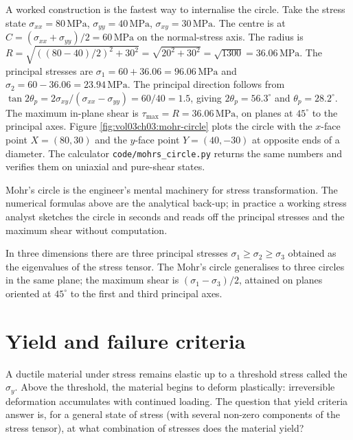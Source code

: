 

A worked construction is the fastest way to internalise the circle.
Take the stress state $\sigma_{xx} = 80\,\text{MPa}$, $\sigma_{yy} =
40\,\text{MPa}$, $\sigma_{xy} = 30\,\text{MPa}$. The centre is at
$C = (\sigma_{xx} + \sigma_{yy})/2 = 60\,\text{MPa}$ on the normal-stress
axis. The radius is $R = \sqrt{((80-40)/2)^2 + 30^2} = \sqrt{20^2 + 30^2}
= \sqrt{1300} = 36.06\,\text{MPa}$. The principal stresses are $\sigma_1
= 60 + 36.06 = 96.06\,\text{MPa}$ and $\sigma_2 = 60 - 36.06 = 23.94\,
\text{MPa}$. The principal direction follows from $\tan 2\theta_p =
2\sigma_{xy}/(\sigma_{xx} - \sigma_{yy}) = 60/40 = 1.5$, giving
$2\theta_p = 56.3^{\circ}$ and $\theta_p = 28.2^{\circ}$. The maximum
in-plane shear is $\tau_{\max} = R = 36.06\,\text{MPa}$, on planes at
$45^{\circ}$ to the principal axes. Figure
\ref{fig:vol03ch03:mohr-circle} plots the circle with the $x$-face
point $X = (80, 30)$ and the $y$-face point $Y = (40, -30)$ at opposite
ends of a diameter. The calculator
\texttt{code/mohrs\_circle.py} returns the same numbers and verifies
them on uniaxial and pure-shear states.

Mohr's circle is the engineer's mental machinery for stress
transformation. The numerical formulas above are the analytical
back-up; in practice a working stress analyst sketches the circle
in seconds and reads off the principal stresses and the maximum
shear without computation.

In three dimensions there are three principal stresses $\sigma_1
\geq \sigma_2 \geq \sigma_3$ obtained as the eigenvalues of the
stress tensor. The Mohr's circle generalises to three circles in
the same plane; the maximum shear is $(\sigma_1 - \sigma_3)/2$,
attained on planes oriented at $45^{\circ}$ to the first and third
principal axes.

\section{Yield and failure criteria}

A ductile material under stress remains elastic up to a threshold
stress called the  $\sigma_y$. Above the
threshold, the material begins to deform plastically: irreversible
deformation accumulates with continued loading. The question that
yield criteria answer is, for a general state of stress (with
several non-zero components of the stress tensor), at what
combination of stresses does the material yield?

